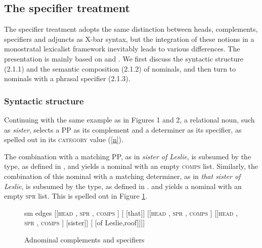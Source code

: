 \documentclass[output=paper
                ,modfonts
                ,nonflat
	        ,collection
	        ,collectionchapter
	        ,collectiontoclongg
 	        ,biblatex
                ,babelshorthands
                ,newtxmath
                ,draftmode
                ,colorlinks, citecolor=brown
]{./langsci/langscibook}
\begin{document}
    
\subsection{The specifier treatment} 


The specifier treatment adopts the same distinction between heads, complements, 
specifiers and adjuncts as X-bar syntax, but the integration of these notions 
in a monostratal lexicalist framework inevitably leads to various differences. 
The presentation is mainly based on \citet{ps2} and \citet{GS00}. 
We first discuss the syntactic structure (2.1.1) and the semantic composition (2.1.2) 
of nominals, and then turn to nominals with a phrasal specifier (2.1.3). 


\subsubsection{Syntactic structure}


Continuing with the same example as in Figures 1 and 2, 
a relational noun, such as \emph{sister}, selects a PP as its complement 
and a determiner as its specifier, as spelled out in its \textsc{category} value
(\ref{n}). 

\begin{exe} 
\ex\label{n}
\begin{avm}
\end{avm}
\end{exe}

\noindent
The combination with a matching PP, as in \emph{sister of Leslie},   
is subsumed by the  type, as defined in , 
and yields a nominal with an empty \textsc{comps} list.  
Similarly, the combination of this nominal with a matching determiner, as in \emph{that sister of Leslie},    
is subsumed by the  type, as defined in . 
and yields a nominal with an empty \textsc{spr} list. This is spelled out in Figure \ref{les}. 

\begin{figure}
	\centering
	\begin{forest}
sm edges
[{[\textsc{head}  , \textsc{spr} \eliste, \textsc{comps} \eliste]}
		[ [that]]
		[{[\textsc{head} , \textsc{spr} , \textsc{comps} \eliste]} 
			[{[\textsc{head} , \textsc{spr} , \textsc{comps} ]} [sister]]
			[ [of Leslie,roof]]]]	
	\end{forest}
	\caption{\label{les} Adnominal complements and specifiers}
\end{figure}
\end{document}

